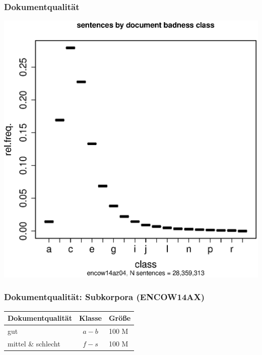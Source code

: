	\begin{frame}
	  \frametitle{Dokumentqualität}
	  \centering
	  \includegraphics[height=0.9\textheight]{graphics/encow14az04_bdc}
\end{frame}



\begin{frame}
	\frametitle{Dokumentqualität: Subkorpora (ENCOW14AX)}
	\centering
	\begin{tabular}{lcl}
 		\textbf{Dokumentqualität} & \textbf{Klasse} & \textbf{Größe}\\
		\hline
	        gut           & $a-b$ & 100 M\\  
	 		mittel \& schlecht        & $f-s$ & 100 M\\
		\hline
	\end{tabular}
\end{frame}


%
%
%
%


